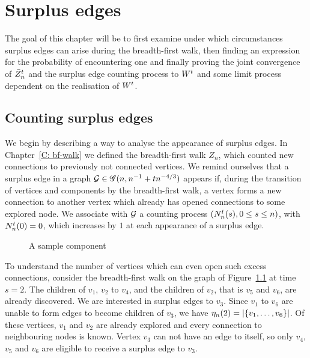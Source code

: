 
\chapter{Surplus edges}

The goal of this chapter will be to first examine under which circumstances surplus edges can arise during the breadth-first walk,
then finding an expression for the probability of encountering one 
and finally proving the joint convergence of $\bar{Z}^t_n$ and the surplus edge counting process to $W^t$ and some limit process dependent on the realisation of $W^t$.



\section{Counting surplus edges}

We begin by describing a way to analyse the appearance of surplus edges.
In Chapter~\ref{C: bf-walk} we defined the breadth-first walk $Z_n$, 
which counted new connections to previously not connected vertices.
We remind ourselves that a surplus edge in a graph $\mathcal{G} \in \mathscr{G}(n, n^{-1} + tn^{-4/3})$ appears if,
during the transition of vertices and components by the breadth-first walk,
a vertex forms a new connection to another vertex
which already has opened connections to some explored node.
We associate with $\mathcal{G}$ a counting process $(N_n^t(s), 0 \leq s \leq n)$,
with $N_n^t(0) = 0$, which increases by $1$ at each appearance of a surplus edge.

\begin{figure}[ht]
	
	\caption{A sample component} 
	\label{F: Surplus Edges Tree}
\end{figure}

To understand the number of vertices which can even open such excess connections, 
consider the breadth-first walk on the graph of Figure~\ref{F: Surplus Edges Tree} at time $s=2$.
The children of $v_1$, $v_2$ to $v_4$, and the children of $v_2$, that is $v_5$ and $v_6$, are already discovered.
We are interested in surplus edges to $v_3$.
Since $v_1$ to $v_6$ are unable to form edges to become children of $v_3$, we have $\eta_n(2) = |\{ v_1, \dots,  v_6\}|$.
Of these vertices, $v_1$ and $v_2$ are already explored and every connection to neighbouring nodes is known.
Vertex $v_3$ can not have an edge to itself, so only $v_4$, $v_5$ and $v_6$ are eligible to receive a surplus edge to $v_3$.

